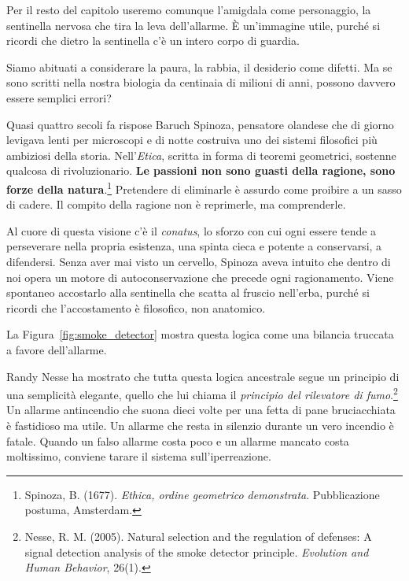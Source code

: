 Per il resto del capitolo useremo comunque l'amigdala come personaggio, la sentinella nervosa che tira la leva dell'allarme. È un'immagine utile, purché si ricordi che dietro la sentinella c'è un intero corpo di guardia.

Siamo abituati a considerare la paura, la rabbia, il desiderio come difetti. Ma se sono scritti nella nostra biologia da centinaia di milioni di anni, possono davvero essere semplici errori?

Quasi quattro secoli fa rispose Baruch Spinoza, pensatore olandese che di giorno levigava lenti per microscopi e di notte costruiva uno dei sistemi filosofici più ambiziosi della storia. Nell'\textit{Etica}, scritta in forma di teoremi geometrici, sostenne qualcosa di rivoluzionario. \textbf{Le passioni non sono guasti della ragione, sono forze della natura}.\footnote{Spinoza, B. (1677). \textit{Ethica, ordine geometrico demonstrata}. Pubblicazione postuma, Amsterdam.} Pretendere di eliminarle è assurdo come proibire a un sasso di cadere. Il compito della ragione non è reprimerle, ma comprenderle.

Al cuore di questa visione c'è il \textit{conatus}, lo sforzo con cui ogni essere tende a perseverare nella propria esistenza, una spinta cieca e potente a conservarsi, a difendersi. Senza aver mai visto un cervello, Spinoza aveva intuito che dentro di noi opera un motore di autoconservazione che precede ogni ragionamento. Viene spontaneo accostarlo alla sentinella che scatta al fruscio nell'erba, purché si ricordi che l'accostamento è filosofico, non anatomico.

La Figura~\ref{fig:smoke_detector} mostra questa logica come una bilancia truccata a favore dell'allarme.


Randy Nesse ha mostrato che tutta questa logica ancestrale segue un principio di una semplicità elegante, quello che lui chiama il \textit{principio del rilevatore di fumo}.\footnote{Nesse, R. M. (2005). Natural selection and the regulation of defenses: A signal detection analysis of the smoke detector principle. \textit{Evolution and Human Behavior}, 26(1).} Un allarme antincendio che suona dieci volte per una fetta di pane bruciacchiata è fastidioso ma utile. Un allarme che resta in silenzio durante un vero incendio è fatale. Quando un falso allarme costa poco e un allarme mancato costa moltissimo, conviene tarare il sistema sull'iperreazione.

